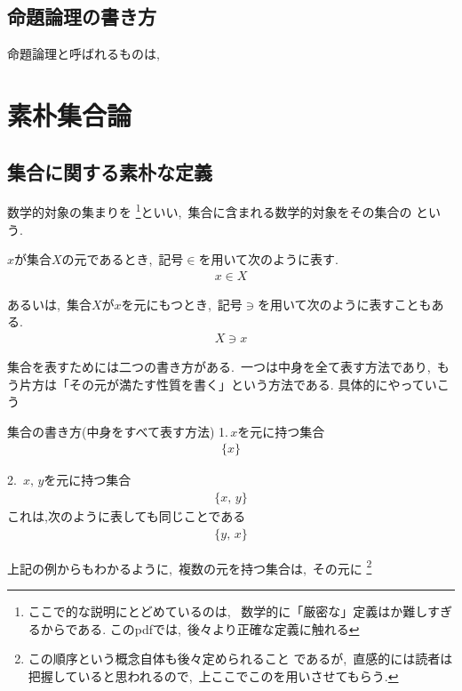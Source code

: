 \documentclass[hyperref,a4paper,12pt]{kininaruki}
\begin{document}
\subsection{命題論理の書き方}
命題論理と呼ばれるものは,
\section{素朴集合論}
\subsection{集合に関する素朴な定義}
数学的対象の集まりを
\footnote{ここで的な説明にとどめているのは,%
\, 数学的に「厳密な」定義はか難しすぎるからである.
このpdfでは,\, 後々より正確な定義に触れる}といい,\, 
集合に含まれる数学的対象をその集合の
という.
\begin{shadebox}
    $x$が集合$X$の元であるとき,\, 記号$\in$を用いて次のように表す.
    \begin{align}
        x\in X
    \end{align}
    \begin{boxnote}
    あるいは,\, 集合$X$が$x$を元にもつとき,\, 記号$\ni$を用いて次のように表すこともある.
    \begin{align}
        X\ni x
    \end{align}
    \end{boxnote}
\end{shadebox}
集合を表すためには二つの書き方がある.\, 一つは中身を全て表す方法であり,\, %
もう片方は「その元が満たす性質を書く」という方法である.
具体的にやっていこう
\emptyline
\begin{itembox}[l]{集合の書き方(中身をすべて表す方法)}
    1.\,$x$を元に持つ集合
    \begin{align}
        \{x\}
    \end{align}

    2.\, $x,\, y$を元に持つ集合
    \begin{align}
        \{x,\, y\}
    \end{align}
    これは,次のように表しても同じことである
    \begin{align}
        \{y,\, x\}
    \end{align}
\end{itembox}
上記の例からもわかるように,\, 複数の元を持つ集合は,\, その元に
\footnote{この順序という概念自体も後々定められること
であるが,\, 直感的には読者は把握していると思われるので,\, 
上ここでこのを用いさせてもらう.}
\end{document}
